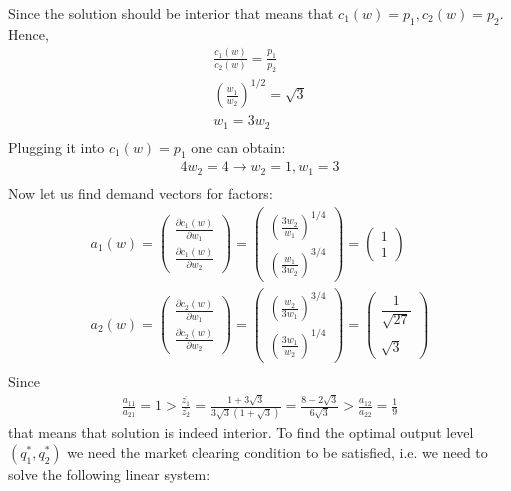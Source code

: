 \documentclass[a4paper]{article}
\begin{document}
Since the solution should be interior that means that $c_1(w) = p_1, c_2(w) = p_2$. Hence, 
\begin{align*}
\frac{c_1(w)}{c_2(w)} = \frac{p_1}{p_2}\\
\left(\frac{w_1}{w_2}\right)^{1/2} = \sqrt{3}\\
w_1 = 3w_2\\
\end{align*}
Plugging it into $c_1(w) = p_1$ one can obtain:
\begin{align*}
4w_2 = 4 \to w_2 = 1, w_1 = 3\\
\end{align*}
Now let us find demand vectors for factors:
\begin{align*}
a_1(w) = \begin{pmatrix}
\frac{\partial c_1(w)}{\partial w_1}\\
\frac{\partial c_1(w)}{\partial w_2}
\end{pmatrix} = \begin{pmatrix}
\left(\frac{3w_2}{w_1}\right)^{1/4}\\
\left(\frac{w_1}{3w_2}\right)^{3/4}
\end{pmatrix} = \begin{pmatrix}
1\\
1
\end{pmatrix}\\
a_2(w) = \begin{pmatrix}
\frac{\partial c_2(w)}{\partial w_1}\\
\frac{\partial c_2(w)}{\partial w_2}
\end{pmatrix} = \begin{pmatrix}
\left(\frac{w_2}{3w_1}\right)^{3/4}\\
\left(\frac{3w_1}{w_2}\right)^{1/4}
\end{pmatrix} = \begin{pmatrix}
\dfrac{1}{\sqrt{27}}\\
\\
\sqrt{3}
\end{pmatrix}\\
\end{align*}
Since
\begin{align*}
\frac{a_{11}}{a_{21}} = 1 > \frac{\bar{z_1}}{\bar{z_2}} = \frac{1+3\sqrt{3}}{3\sqrt{3}(1 + \sqrt{3})} = \frac{8 - 2\sqrt{3}}{6\sqrt{3}} > \frac{a_{12}}{a_{22}} = \frac{1}{9}
\end{align*}
that means that solution is indeed interior.
To find the optimal output level $(q_1^*, q_2^*)$ we need the market clearing condition to be satisfied, i.e. we need to solve the following linear system:
\end{document}
